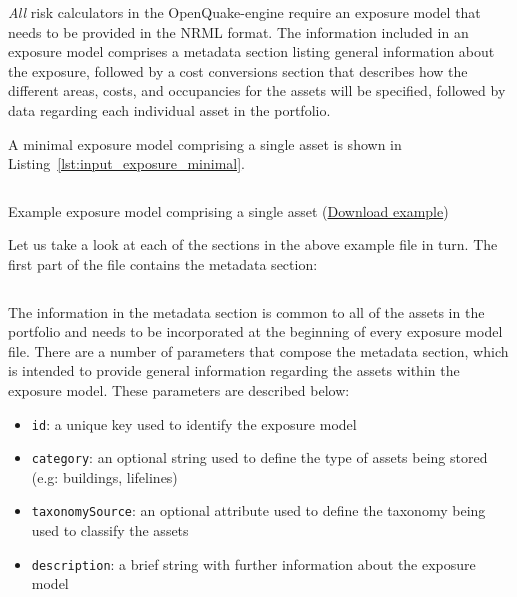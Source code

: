 \emph{All} risk calculators in the OpenQuake-engine require an \gls{exposure
model} that needs to be provided in the NRML format. The information included
in an exposure model comprises a metadata section listing general information
about the exposure, followed by a cost conversions section that describes how
the different areas, costs, and occupancies for the assets will be specified,
followed by data regarding each individual asset in the portfolio.

A minimal exposure model comprising a single asset is shown in Listing~\ref{lst:input_exposure_minimal}.

\begin{listing}[htbp]
  \inputminted[firstline=1,firstnumber=1,fontsize=\footnotesize,frame=single,linenos,bgcolor=lightgray]{xml}{oqum/risk/Verbatim/input_exposure_minimal.xml}
  \caption{Example exposure model comprising a single asset (\href{https://raw.githubusercontent.com/GEMScienceTools/oq-engine-docs/master/oqum/risk/verbatim/input_exposure_minimal.xml}{Download example})}
  \label{lst:input_exposure_minimal}
\end{listing}

Let us take a look at each of the sections in the above example file in turn.
The first part of the file contains the metadata section:

\inputminted[firstline=5,firstnumber=5,lastline=8,fontsize=\footnotesize,frame=single,linenos,bgcolor=lightgray]{xml}{oqum/risk/Verbatim/input_exposure_minimal.xml}

The information in the metadata section is common to all of the assets in the
portfolio and needs to be incorporated at the beginning of every exposure
model file. There are a number of parameters that compose the metadata
section, which is intended to provide general information regarding the
\glspl{asset} within the \gls{exposure model}. These parameters are described
below:

\begin{itemize}

  \item \Verb+id+: a unique key used to identify the \gls{exposure model}

  \item \Verb+category+: an optional string used to define the type of
    \glspl{asset} being stored (e.g: buildings, lifelines)

  \item \Verb+taxonomySource+: an optional attribute used to define the
    \gls{taxonomy} being used to classify the \glspl{asset}

  \item \Verb+description+: a brief string with further information about the
    \gls{exposure model}

\end{itemize}


